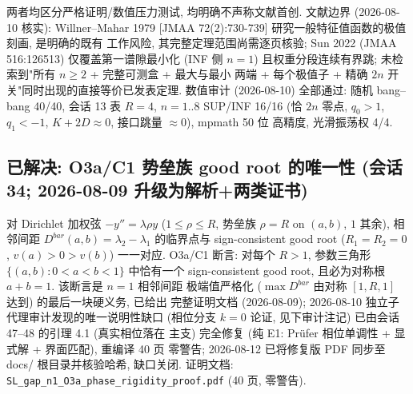 \documentclass[UTF8]{ctexart}
\begin{document}
两者均区分严格证明/数值压力测试, 均明确不声称文献首创. 文献边界 (2026-08-10 核实):
Willner--Mahar 1979 [JMAA 72(2):730-739] 研究一般特征值函数的极值刻画, 是明确的既有
工作风险, 其完整定理范围尚需逐页核验; Sun 2022 (JMAA 516:126513) 仅覆盖第一谱隙最小化
(INF 侧 $n=1$) 且权重分段连续有界跳; 未检索到"所有 $n\ge2$ + 完整可测盒 + 最大与最小
两端 + 每个极值子 + 精确 $2n$ 开关"同时出现的直接等价已发表定理. 数值审计 (2026-08-10)
全部通过: 随机 bang--bang 40/40, 会话 13 表 $R=4$, $n=1..8$ SUP/INF 16/16
(恰 $2n$ 零点, $q_0>1$, $q_1<-1$, $K+2D\approx0$, 接口跳量 $\approx0$), mpmath 50 位
高精度, 光滑振荡权 4/4.

\subsection{\texorpdfstring{已解决: O3a/C1 势垒族 good root 的唯一性 (会话 34; 2026-08-09 升级为解析+两类证书)}{已解决: O3a/C1 势垒族 good root 的唯一性 (会话 34; 2026-08-09 升级为解析+两类证书)}}

对 Dirichlet 加权弦 $-y''=\lambda\rho y$ ($1\le\rho\le R$, 势垒族
$\rho=R$ on $(a,b)$, $1$ 其余), 相邻间距 $D^{bar}(a,b)=\lambda_2-\lambda_1$
的临界点与 sign-consistent good root ($R_1=R_2=0$, $v(a)>0>v(b)$) 一一对应.
O3a/C1 断言: 对每个 $R>1$, 参数三角形 $\{(a,b):0<a<b<1\}$ 中恰有一个
sign-consistent good root, 且必为对称根 $a+b=1$. 该断言是 $n=1$ 相邻间距
极端值严格化 ($\max D^{bar}$ 由对称 $[1,R,1]$ 达到) 的最后一块硬义务, 已给出
完整证明文档 (2026-08-09); 2026-08-10 独立子代理审计发现的唯一说明性缺口
(相位分支 $k=0$ 论证, 见下审计注记) 已由会话 47--48 的引理 4.1 (真实相位落在
主支) 完全修复 (纯 E1: Pr\"ufer 相位单调性 + 显式解 + 界面匹配), 重编译 40 页
零警告; 2026-08-12 已将修复版 PDF 同步至 docs/ 根目录并核验哈希, 缺口关闭.
证明文档: \texttt{SL\_gap\_n1\_O3a\_phase\_rigidity\_proof.pdf} (40 页, 零警告).
\end{document}

